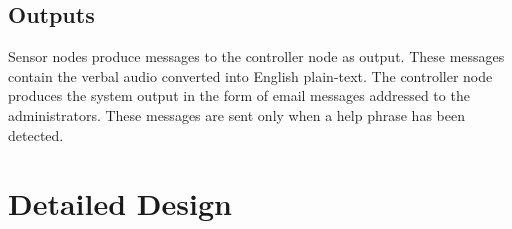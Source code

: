 \documentclass[11pt,a4paper]{article}
\begin{document}
\subsection{Outputs}
Sensor nodes produce messages to the controller node as output. These messages contain the verbal audio converted into English plain-text. The controller node produces the system output in the form of email messages addressed to the administrators. These messages are sent only when a help phrase has been detected.

\section{Detailed Design}
\end{document}
